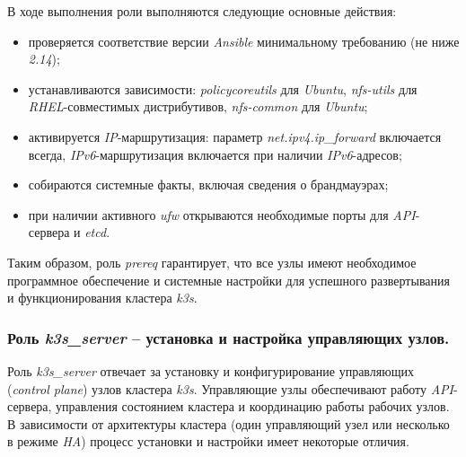 В ходе выполнения роли выполняются следующие основные действия:
\begin{itemize}
  \item проверяется соответствие версии \textit{Ansible} минимальному требованию (не ниже \textit{2.14});
  \item устанавливаются зависимости: \textit{policycoreutils} для \textit{Ubuntu}, \textit{nfs-utils} для \textit{RHEL}-совместимых дистрибутивов, \textit{nfs-common} для \textit{Ubuntu};
  \item активируется \textit{IP}-маршрутизация: параметр \textit{net.ipv4.ip\_forward} включается всегда, \textit{IPv6}-маршрутизация включается при наличии \textit{IPv6}-адресов;
  \item собираются системные факты, включая сведения о брандмауэрах;
  \item при наличии активного \textit{ufw} открываются необходимые порты для \textit{API}-сервера и \textit{etcd}.
\end{itemize}

Таким образом, роль \textit{prereq} гарантирует, что все узлы имеют необходимое программное обеспечение и системные настройки для успешного развертывания и функционирования кластера \textit{k3s}.

\subsubsection{Роль \textit{k3s\_server} -- установка и настройка управляющих узлов.}
Роль \textit{k3s\_server} отвечает за установку и конфигурирование управляющих (\textit{control plane}) узлов кластера \textit{k3s}. Управляющие узлы обеспечивают работу \textit{API}-сервера, управления состоянием кластера и координацию работы рабочих узлов. В зависимости от архитектуры кластера (один управляющий узел или несколько в режиме \textit{HA}) процесс установки и настройки имеет некоторые отличия.

